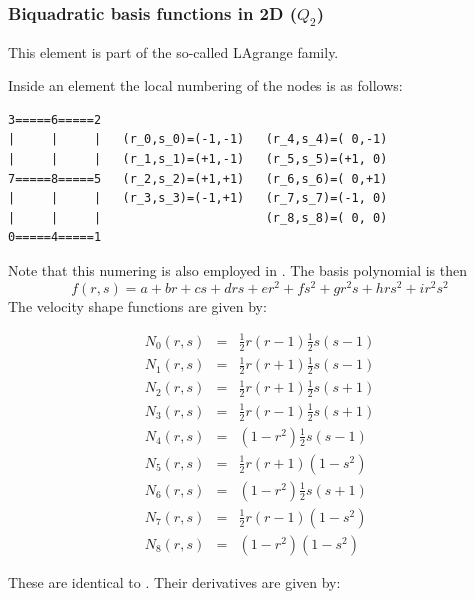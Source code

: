 \subsubsection{Biquadratic basis functions in 2D ($Q_2$)}

This element is part of the so-called LAgrange family. 

Inside an element the local numbering of the nodes is as follows:
\begin{verbatim}
3=====6=====2
|     |     |   (r_0,s_0)=(-1,-1)   (r_4,s_4)=( 0,-1)
|     |     |   (r_1,s_1)=(+1,-1)   (r_5,s_5)=(+1, 0)
7=====8=====5   (r_2,s_2)=(+1,+1)   (r_6,s_6)=( 0,+1)
|     |     |   (r_3,s_3)=(-1,+1)   (r_7,s_7)=(-1, 0)
|     |     |                       (r_8,s_8)=( 0, 0)
0=====4=====1
\end{verbatim}
Note that this numering is also employed in \cite[56]{li06}.
The basis polynomial is then
\[
f(r,s) = a + br + cs + drs + er^2 + fs^2 + gr^2s + hrs^2 + i r^2s^2
\]
The velocity shape functions are given by:
\begin{mdframed}[backgroundcolor=blue!5]
\begin{eqnarray}
N_0(r,s)&=& \frac{1}{2}r(r-1)  \frac{1}{2}s(s-1)\nonumber\\
N_1(r,s)&=& \frac{1}{2}r(r+1)  \frac{1}{2}s(s-1)\nonumber\\
N_2(r,s)&=& \frac{1}{2}r(r+1)  \frac{1}{2}s(s+1)\nonumber\\
N_3(r,s)&=& \frac{1}{2}r(r-1)  \frac{1}{2}s(s+1)\nonumber\\
N_4(r,s)&=&     (1-r^2)  \frac{1}{2}s(s-1)\nonumber\\
N_5(r,s)&=& \frac{1}{2}r(r+1)      (1-s^2)\nonumber\\
N_6(r,s)&=&     (1-r^2)  \frac{1}{2}s(s+1)\nonumber\\
N_7(r,s)&=& \frac{1}{2}r(r-1)      (1-s^2)\nonumber\\
N_8(r,s)&=&     (1-r^2)      (1-s^2)\nonumber
\end{eqnarray}
\end{mdframed}
These are identical to \cite[p57]{li06}. Their derivatives are given by:
